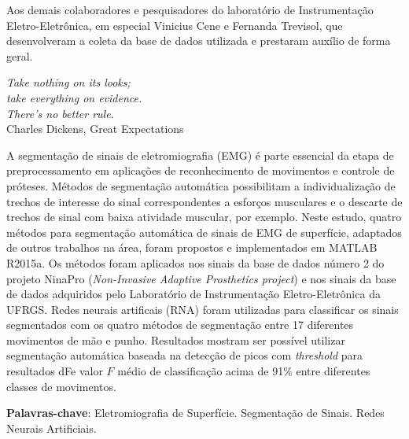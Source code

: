 
\begin{agradecimentos}
	Aos demais colaboradores e pesquisadores do laboratório de Instrumentação Eletro-Eletrônica, em especial Vinicius Cene e Fernanda Trevisol, que desenvolveram a coleta da base de dados utilizada e prestaram auxílio de forma geral.
\end{agradecimentos}


\begin{epigrafe}
    \vspace*{\fill}
	\begin{flushright}
		\textit{Take nothing on its looks;\\ take everything on evidence.\\ There's no better rule.}\\ \vspace{\onelineskip}
		Charles Dickens, Great Expectations
	\end{flushright}
\end{epigrafe}


\setlength{\absparsep}{18pt} %
\begin{resumo}

	A segmentação de sinais de eletromiografia (EMG) é parte essencial da etapa de preprocessamento em aplicações de reconhecimento de movimentos e controle de próteses. Métodos de segmentação automática possibilitam a individualização de trechos de interesse do sinal correspondentes a esforços musculares e o descarte de trechos de sinal com baixa atividade muscular, por exemplo. Neste estudo, quatro métodos para segmentação automática de sinais de EMG de superfície, adaptados de outros trabalhos na área, foram propostos e implementados em MATLAB R2015a. Os métodos foram aplicados nos sinais da base de dados número 2 do projeto NinaPro (\emph{Non-Invasive Adaptive Prosthetics project}) e nos sinais da base de dados adquiridos pelo Laboratório de Instrumentação Eletro-Eletrônica da UFRGS. Redes neurais artificais (RNA) foram utilizadas para classificar os sinais segmentados com os quatro métodos de segmentação entre 17 diferentes movimentos de mão e punho. Resultados mostram ser possível utilizar segmentação automática baseada na detecção de picos com \emph{threshold} para resultados dFe valor $F$ médio de classificação acima de 91\% entre diferentes classes de movimentos.
	

	\vspace{\onelineskip}
	\textbf{Palavras-chave}: Eletromiografia de Superfície. Segmentação de Sinais. Redes Neurais Artificiais.
\end{resumo}

